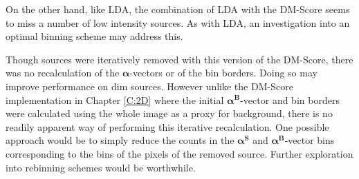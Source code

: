 On the other hand, like LDA, the combination of LDA with the DM-Score seems to miss a number of low intensity sources. As with LDA, an investigation into an optimal binning scheme may address this.

Though sources were iteratively removed with this version of the DM-Score, there was no recalculation of the $\boldsymbol{\alpha}$-vectors or of the bin borders. Doing so may improve performance on dim sources. However unlike the DM-Score implementation in Chapter \ref{C:2D} where the initial $\boldsymbol{\alpha^B}$-vector and bin borders were calculated using the whole image as a proxy for background, there is no readily apparent way of performing this iterative recalculation. One possible approach would be to simply reduce the counts in the $\boldsymbol{\alpha^S}$ and $\boldsymbol{\alpha^B}$-vector bins corresponding to the bins of the pixels of the removed source. Further exploration into rebinning schemes would be worthwhile.





